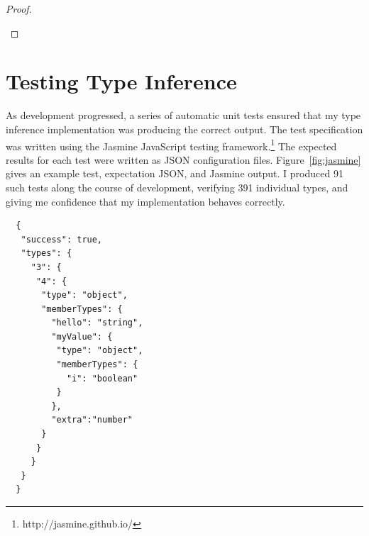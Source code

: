\documentclass[12pt,a4paper,twoside,openright]{report}
\theoremstyle{definition}
\theoremstyle{dotless}
\newcommand{\typable}[2][ ]{\Gamma{}\vdash\mathtt{#2}\, |_C#1\:\Gamma#1'}
\newcommand{\indHyp}{\Phi(\Gamma, m, C, \Gamma')}
\begin{document}
\begin{proof}
\begin{case}[RetTypable4]
  \end{case}

%
%
%
%
%
\end{proof}



\section{Testing Type Inference}

As development progressed, a series of automatic unit tests ensured that my
type inference implementation was producing the correct output.  The test
specification was written using the Jasmine JavaScript testing
framework.\footnote{http://jasmine.github.io/} The expected results for each
test were written as JSON configuration files. Figure~\ref{fig:jasmine} gives an example
test, expectation JSON, and Jasmine output. I produced 91 such tests along the
course of development, verifying 391 individual types, and giving me confidence
that my implementation behaves correctly.

\newsavebox{\testbox}
\begin{lrbox}{\testbox}
\begin{minipage}[c]{75mm}
  \begin{verbatim}
  {
   "success": true,
   "types": {
     "3": {
      "4": {
       "type": "object",
       "memberTypes": {
         "hello": "string",
         "myValue": {
          "type": "object",
          "memberTypes": {
            "i": "boolean"
          }
         },
         "extra":"number"
       }
      }
     }
   }
  }
\end{verbatim}
\end{minipage}
\end{lrbox}
\end{document}
